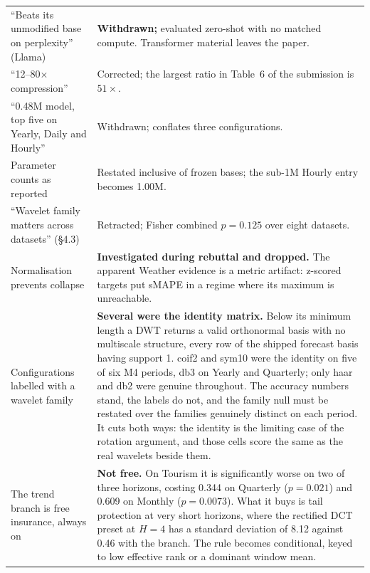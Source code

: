 \begin{table}[t]
\begin{tabular}{p{}p{}}
  \addlinespace[2pt]
  ``Beats its unmodified base on perplexity'' (Llama) &
    \textbf{Withdrawn;} evaluated zero-shot with no matched compute.
    Transformer material leaves the paper. \\
  \addlinespace[2pt]
  ``12--80$\times$ compression'' &
    Corrected; the largest ratio in Table~6 of the submission is $51\times$. \\
  \addlinespace[2pt]
  ``0.48M model, top five on Yearly, Daily and Hourly'' &
    Withdrawn; conflates three configurations. \\
  \addlinespace[2pt]
  Parameter counts as reported &
    Restated inclusive of frozen bases; the sub-1M Hourly entry becomes
    1.00M. \\
  \addlinespace[2pt]
  ``Wavelet family matters across datasets'' (\S4.3) &
    Retracted; Fisher combined $p = 0.125$ over eight datasets. \\
  \addlinespace[2pt]
  Normalisation prevents collapse &
    \textbf{Investigated during rebuttal and dropped.} The apparent Weather
    evidence is a metric artifact: z-scored targets put sMAPE in a regime
    where its maximum is unreachable. \\
  \addlinespace[2pt]
  Configurations labelled with a wavelet family &
    \textbf{Several were the identity matrix.} Below its minimum length a
    DWT returns a valid orthonormal basis with no multiscale structure,
    every row of the shipped forecast basis having support 1. coif2 and
    sym10 were the identity on five of six M4 periods, db3 on Yearly and
    Quarterly; only haar and db2 were genuine throughout. The accuracy
    numbers stand, the labels do not, and the family null must be restated
    over the families genuinely distinct on each period. It cuts both ways:
    the identity is the limiting case of the rotation argument, and those
    cells score the same as the real wavelets beside them. \\
  \addlinespace[2pt]
  The trend branch is free insurance, always on &
    \textbf{Not free.} On Tourism it is significantly worse on two of three
    horizons, costing 0.344 on Quarterly ($p = 0.021$) and 0.609 on Monthly
    ($p = 0.0073$). What it buys is tail protection at very short horizons,
    where the rectified DCT preset at $H=4$ has a standard deviation of 8.12
    against 0.46 with the branch. The rule becomes conditional, keyed to low
    effective rank or a dominant window mean. \\
  \bottomrule
\end{tabular}
\end{table}
